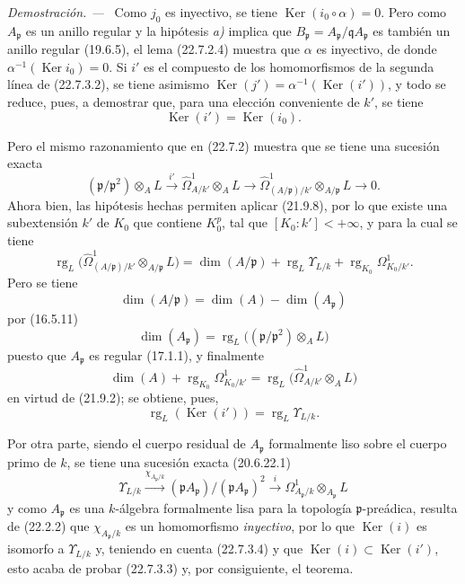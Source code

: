 \documentclass[10pt,oneside]{book}
\newenvironment{proof}{%
  \par\medskip\noindent\textit{Demostración. ---\ }}{\par}
\providecommand{\setmin}{-}%
\begin{document}
\begin{proof}
Como $j_0$ es inyectivo, se tiene $\operatorname{Ker}(i_0\circ\alpha)=0$. Pero como
$A_{\mathfrak p}$ es un anillo regular y la hipótesis \emph{a)} implica que
$B_{\mathfrak p}=A_{\mathfrak p}/\mathfrak qA_{\mathfrak p}$ es también un
anillo regular (19.6.5), el lema (22.7.2.4) muestra que $\alpha$ es inyectivo,
de donde $\alpha^{-1}(\operatorname{Ker} i_0)=0$. Si $i'$ es el compuesto de los homomorfismos de la
segunda línea de (22.7.3.2), se tiene asimismo
$\operatorname{Ker}(j')=\alpha^{-1}(\operatorname{Ker}(i'))$, y todo se reduce, pues, a demostrar que, para una
elección conveniente de $k'$, se tiene
\begin{equation}
\label{0.22.7.3.3-es}
  \operatorname{Ker}(i')=\operatorname{Ker}(i_0).
  \tag{22.7.3.3}
\end{equation}

Pero el mismo razonamiento que en (22.7.2) muestra que se tiene una sucesión exacta
\[
  (\mathfrak p/\mathfrak p^2)\otimes_AL\xrightarrow{i'}
  \widehat\Omega^1_{A/k'}\otimes_AL\longrightarrow
  \widehat\Omega^1_{(A/\mathfrak p)/k'}\otimes_{A/\mathfrak p}L
  \longrightarrow0.
\]
Ahora bien, las hipótesis hechas permiten aplicar (21.9.8), por lo que existe una
subextensión $k'$ de $K_0$ que contiene $K_0^p$, tal que
$[K_0:k']<+\infty$, y para la cual se tiene
\[
  \operatorname{rg}_L\bigl(\widehat\Omega^1_{(A/\mathfrak p)/k'}
  \otimes_{A/\mathfrak p}L\bigr)
  =\dim(A/\mathfrak p)+\operatorname{rg}_L\Upsilon_{L/k}
  +\operatorname{rg}_{K_0}\Omega^1_{K_0/k'}.
\]
Pero se tiene
\[
  \dim(A/\mathfrak p)=\dim(A)\setmin\dim(A_{\mathfrak p})
\]
por (16.5.11)
\[
  \dim(A_{\mathfrak p})
  =\operatorname{rg}_L\bigl((\mathfrak p/\mathfrak p^2)\otimes_AL\bigr)
\]
puesto que $A_{\mathfrak p}$ es regular (17.1.1), y finalmente
\[
  \dim(A)+\operatorname{rg}_{K_0}\Omega^1_{K_0/k'}
  =\operatorname{rg}_L\bigl(\widehat\Omega^1_{A/k'}\otimes_AL\bigr)
\]
en virtud de (21.9.2); se obtiene, pues,
\begin{equation}
\label{0.22.7.3.4-es}
  \operatorname{rg}_L(\operatorname{Ker}(i'))=\operatorname{rg}_L\Upsilon_{L/k}.
  \tag{22.7.3.4}
\end{equation}

Por otra parte, siendo el cuerpo residual de $A_{\mathfrak p}$ formalmente liso
sobre el cuerpo primo de $k$, se tiene una sucesión exacta (20.6.22.1)
\[
  \Upsilon_{L/k}\xrightarrow{\chi_{A_{\mathfrak p}/k}}
  (\mathfrak pA_{\mathfrak p})/(\mathfrak pA_{\mathfrak p})^2
  \xrightarrow{i}\Omega^1_{A_{\mathfrak p}/k}
  \otimes_{A_{\mathfrak p}}L
\]
y como $A_{\mathfrak p}$ es una $k$-álgebra formalmente lisa para la
topología $\mathfrak p$-preádica, resulta de (22.2.2) que
$\chi_{A_{\mathfrak p}/k}$ es un homomorfismo \emph{inyectivo}, por lo que $\operatorname{Ker}(i)$ es
isomorfo a $\Upsilon_{L/k}$ y, teniendo en cuenta (22.7.3.4) y que
$\operatorname{Ker}(i)\subset\operatorname{Ker}(i')$, esto acaba de probar (22.7.3.3) y, por consiguiente, el
teorema.
\end{proof}
\end{document}
